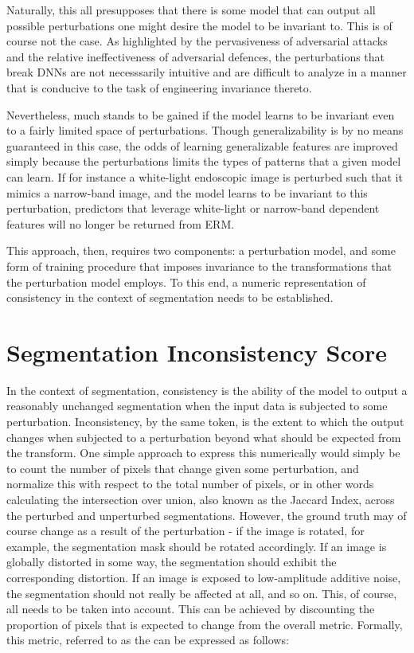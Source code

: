 Naturally, this all presupposes that there is some model that can output all possible perturbations one might desire the model to be invariant to. This is of course not the case. As highlighted by the pervasiveness of adversarial attacks and the relative ineffectiveness of adversarial defences, the perturbations that break DNNs are not necesssarily intuitive and are difficult to analyze in a manner that is conducive to the task of engineering invariance thereto. 

Nevertheless, much stands to be gained if the model learns to be invariant even to a fairly limited space of perturbations. Though generalizability is by no means guaranteed in this case, the odds of learning generalizable features are improved simply because the perturbations limits the types of patterns that a given model can learn. If for instance a white-light endoscopic image is perturbed such that it mimics a narrow-band image, and the model learns to be invariant to this perturbation, predictors that leverage white-light or narrow-band dependent features will no longer be returned from ERM.

This approach, then, requires two components: a perturbation model, and some form of training procedure that imposes invariance to the transformations that the perturbation model employs. To this end, a numeric representation of consistency in the context of segmentation needs to be established.

\section{Segmentation Inconsistency Score}
In the context of segmentation, consistency is the ability of the model to output a reasonably unchanged segmentation when the input data is subjected to some perturbation. Inconsistency, by the same token, is the extent to which the output changes when subjected to a perturbation beyond what should be expected from the transform. One simple approach to express this numerically would simply be to count the number of pixels that change given some perturbation, and normalize this with respect to the total number of pixels, or in other words calculating the intersection over union, also known as the Jaccard Index, across the perturbed and unperturbed segmentations.  However, the ground truth may of course change as a result of the perturbation - if the image is rotated, for example, the segmentation mask should be rotated accordingly. If an image is globally distorted in some way, the segmentation should exhibit the corresponding distortion. If an image is exposed to low-amplitude additive noise, the segmentation should not really be affected at all, and so on. This, of course, all needs to be taken into account. This can be achieved by discounting the proportion of pixels that is expected to change from the overall metric. Formally, this metric, referred to as the  can be expressed as follows:

